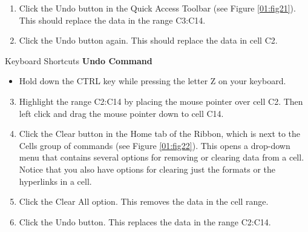 \begin{enumerate}
	\item Click the Undo button in the Quick Access Toolbar (see Figure \ref{01:fig21}). This should replace the data in the range \textsf{C3:C14}.
	\item Click the Undo button again. This should replace the data in cell \textsf{C2}.
\end{enumerate}

\begin{center}
	\begin{shtcutbox}{Keyboard Shortcuts}
		\textbf{Undo Command}
		\\
		\begin{itemize}
			\setlength{\itemsep}{0pt}
			\setlength{\parskip}{0pt}
			\setlength{\parsep}{0pt}
			
			\item Hold down the CTRL key while pressing the letter Z on your keyboard.
			
		\end{itemize}
	\end{shtcutbox}
\end{center}

\begin{enumerate}
	\setcounter{enumi}{2}
	\item Highlight the range \textsf{C2:C14} by placing the mouse pointer over cell \textsf{C2}. Then left click and drag the mouse pointer down to cell \textsf{C14}.
	\item Click the Clear button in the Home tab of the Ribbon, which is next to the Cells group of commands (see Figure \ref{01:fig22}). This opens a drop-down menu that contains several options for removing or clearing data from a cell. Notice that you also have options for clearing just the formats or the hyperlinks in a cell.
	\item Click the Clear All option. This removes the data in the cell range.
	\item Click the Undo button. This replaces the data in the range \textsf{C2:C14}.
\end{enumerate}

